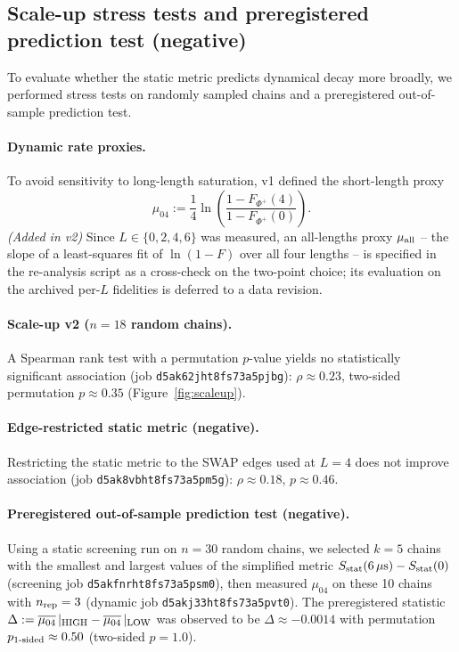 \documentclass[11pt]{article}
\begin{document}
\subsection{Scale-up stress tests and preregistered prediction test (negative)}
\label{sec:negative}
To evaluate whether the static metric predicts dynamical decay more broadly,
we performed stress tests on randomly sampled chains and a preregistered
out-of-sample prediction test.

\paragraph{Dynamic rate proxies.} To avoid sensitivity to long-length
saturation, v1 defined the short-length proxy
\begin{equation}
\mu_{04} := \frac{1}{4} \ln\!\left( \frac{1 - F_{\Phi^+}(4)}{1 - F_{\Phi^+}(0)} \right).
\end{equation}
\emph{(Added in v2)} Since $L \in \{0,2,4,6\}$ was measured, an
all-lengths proxy $\mu_{\rm all}$ -- the slope of a least-squares fit of
$\ln(1 - F)$ over all four lengths -- is specified in the re-analysis script
as a cross-check on the two-point choice; its evaluation on the archived
per-$L$ fidelities is deferred to a data revision.

\paragraph{Scale-up v2 ($n=18$ random chains).} A Spearman rank test with a
permutation $p$-value yields no statistically significant association (job
\texttt{d5ak62jht8fs73a5pjbg}): $\rho \approx 0.23$, two-sided permutation
$p \approx 0.35$ (Figure~\ref{fig:scaleup}).

\paragraph{Edge-restricted static metric (negative).} Restricting the static
metric to the SWAP edges used at $L=4$ does not improve association (job
\texttt{d5ak8vbht8fs73a5pm5g}): $\rho \approx 0.18$, $p \approx 0.46$.

\paragraph{Preregistered out-of-sample prediction test (negative).} Using a
static screening run on $n=30$ random chains, we selected $k=5$ chains with
the smallest and largest values of the simplified metric
$S_{\rm stat}(6\,\mu{\rm s}) - S_{\rm stat}(0)$ (screening job
\texttt{d5akfnrht8fs73a5psm0}), then measured $\mu_{04}$ on these 10 chains
with $n_{\rm rep}=3$ (dynamic job \texttt{d5akj33ht8fs73a5pvt0}). The
preregistered statistic $\Delta := \overline{\mu_{04}}\,|_{\rm HIGH} -
\overline{\mu_{04}}\,|_{\rm LOW}$ was observed to be $\Delta \approx -0.0014$
with permutation $p_{\rm 1\text{-}sided} \approx 0.50$ (two-sided $p = 1.0$).
\end{document}
